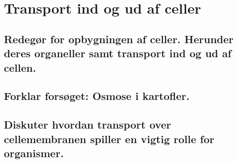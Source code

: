 \newpage
\section{Transport ind og ud af celler}
    \subsection{Redegør for opbygningen af celler. Herunder deres organeller samt transport ind og ud af cellen.}
    \subsection{Forklar forsøget: Osmose i kartofler.}
    \subsection{Diskuter hvordan transport over cellemembranen spiller en vigtig rolle for organismer.}